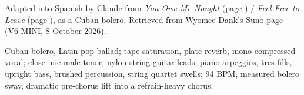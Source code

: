 
\begin{notes}
Adapted into Spanish by Claude from \emph{You Owe Me Nought} (page \pageref{sec:you-owe-me-nought}) / \emph{Feel Free to Leave} (page \pageref{sec:feel-free-to-leave}), as a Cuban bolero. Retrieved from Wyomee Dank's Suno page (V6-MINI, 8 October 2026).
\end{notes}
\begin{style}
Cuban bolero, Latin pop ballad; tape saturation, plate reverb, mono-compressed vocal; close-mic male tenor; nylon-string guitar leads, piano arpeggios, tres fills, upright bass, brushed percussion, string quartet swells; 94 BPM, measured bolero sway, dramatic pre-chorus lift into a refrain-heavy chorus.
\end{style}
